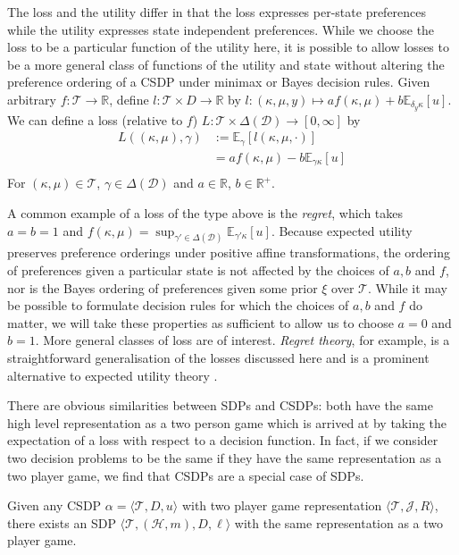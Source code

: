 The loss and the utility differ in that the loss expresses per-state preferences while the utility expresses state independent preferences. While we choose the loss to be a particular function of the utility here, it is possible to allow losses to be a more general class of functions of the utility and state without altering the preference ordering of a CSDP under minimax or Bayes decision rules. Given arbitrary $f:\mathscr{T}\to\mathbb{R}$, define $l:\mathscr{T}\times D\to \mathbb{R}$ by $l:(\kappa,\mu,y)\mapsto a f(\kappa,\mu) + b \mathbb{E}_{\delta_y\kappa}[u]$. We can define a loss (relative to $f$) $L:\mathscr{T}\times\Delta(\mathcal{D})\to [0,\infty]$ by
\begin{align}
    L((\kappa,\mu),\gamma) &:= \mathbb{E}_\gamma[l(\kappa,\mu,\cdot)]\\
                           &= a f(\kappa,\mu) - b \mathbb{E}_{\gamma\kappa}[u]\label{eq:canonical_loss}\\
\end{align}
For $(\kappa,\mu)\in \mathscr{T}$, $\gamma\in \Delta(\mathcal{D})$ and $a\in \mathbb{R}$, $b\in \mathbb{R}^{+}$. 

A common example of a loss of the type above is the \emph{regret}, which takes $a=b=1$ and $f(\kappa,\mu) = \sup_{\gamma'\in \Delta(\mathcal{D})} \mathbb{E}_{\gamma'\kappa}[u]$. Because expected utility preserves preference orderings under positive affine transformations, the ordering of preferences given a particular state is not affected by the choices of $a,b$ and $f$, nor is the Bayes ordering of preferences given some prior $\xi$ over $\mathscr{T}$. While it may be possible to formulate decision rules for which the choices of $a,b$ and $f$ do matter, we will take these properties as sufficient to allow us to choose $a=0$ and $b=1$. More general classes of loss are of interest. \emph{Regret theory}, for example, is a straightforward generalisation of the losses discussed here and is a prominent alternative to expected utility theory \citep{loomes_regret_1982}.

There are obvious similarities between SDPs and CSDPs: both have the same high level representation as a two person game which is arrived at by taking the expectation of a loss with respect to a decision function. In fact, if we consider two decision problems to be the same if they have the same representation as a two player game, we find that CSDPs are a special case of SDPs.

\begin{theorem}\label{th:csdps_are_sdps}
Given any CSDP $\alpha=\langle \mathscr{T}, D, u \rangle$ with two player game representation $\langle \mathscr{T}, \mathscr{J}, R\rangle$, there exists an SDP $\langle \mathscr{T}, (\mathscr{H},m), D,\ell \rangle$ with the same representation as a two player game.
\end{theorem}

